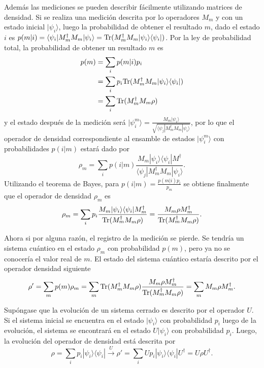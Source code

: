 Además las mediciones se pueden describir fácilmente utilizando matrices de
densidad. Si se realiza una medición descrita por lo operadores $M_m$ y con un
estado inicial $|\psi_i\rangle$, luego la probabilidad de obtener el resultado
$m$, dado el estado $i$ es $p(m|i)=\langle
\psi_i|M_m^{\dagger}M_m|\psi_i\rangle = {\rm Tr}(M_m^{\dagger} M_m |\psi_i\rangle
\langle\psi_i|)$. Por la ley de probabilidad total, la probabilidad de
obtener un resultado $m$ es {\cite{nielsen_chuang_2010}}
\begin{equation}
	\label{probabilidad_m}
	\begin{split}
	p(m) &= \sum_{i}p(m|i)p_i\\
	&=\sum_i p_i{\rm Tr}(M_m^{\dagger} M_m |\psi_i\rangle \langle\psi_i|)\\
	&=\sum_{i}{\rm Tr}(M_m^{\dagger} M_m \rho)
	\end{split}
\end{equation} y el estado después de la medición será $|\psi_i^m\rangle=\frac{M_m|\psi_i\rangle}{\sqrt{\langle\psi_j|M_m^{\dagger}M_m|\psi_i\rangle}}$, por lo que el operador de densidad correspondiente al ensamble de estados $|\psi_i^m\rangle$ con probabilidades $p(i|m)$ estará dado por \[\rho_m=\sum_i p(i|m)\frac{M_m|\psi_i\rangle \langle \psi_i|M^{\dagger}}{\langle\psi_j|M_m^{\dagger}M_m|\psi_i\rangle}.\] Utilizando el teorema de Bayes, para $p(i|m)=\frac{p(m|i)p_i}{p_m}$ se obtiene finalmente que el operador de densidad $\rho_m$ es {\cite{nielsen_chuang_2010}} \begin{equation}
	\rho_m=\sum_i p_i \dfrac{M_m|\psi_i\rangle \langle \psi_i|M_m^{\dagger}}{{\rm Tr}(M^{\dagger}_m M_m \rho )}=\dfrac{M_m \rho M_m^{\dagger}}{{\rm Tr} (M^{\dagger}_m M_m\rho )}.
\end{equation}


Ahora si por alguna razón, el registro de la medición se pierde. Se tendría un
sistema cuántico en el estado $\rho_m$ con probabilidad $p(m)$, pero ya no se
conocería el valor real de $m$. El estado del sistema cuántico estaría descrito
por el operador densidad siguiente \begin{equation}
	\rho'=\sum_m p(m)\rho_m=\sum_m{\rm Tr}(M^{\dagger}_m M_m\rho )\dfrac{M_m\rho M_m^{\dagger}}{{\rm Tr} (M^{\dagger}_m M_m \rho )}=\sum_{m} M_m\rho M_m^{\dagger}.
\end{equation}


Supóngase que la evolución de un sistema cerrado es descrito por el operador
$U$. Si el sistema inicial se encuentra en el estado $|\psi_i\rangle$ con
probabilidad $p_i$ luego de la evolución, el sistema se encontrará en el estado
$U|\psi_i\rangle$ con probabilidad $p_i$. Luego, la evolución del operador de
densidad está descrita por
{\cite{nielsen_chuang_2010}}\[\rho=\sum_{i}p_i|\psi_i\rangle \langle
\psi_i|\xrightarrow{U}\rho'=\sum_{i}Up_i|\psi_i\rangle \langle
\psi_i|U^{\dagger}=U\rho U^{\dagger}.\]


